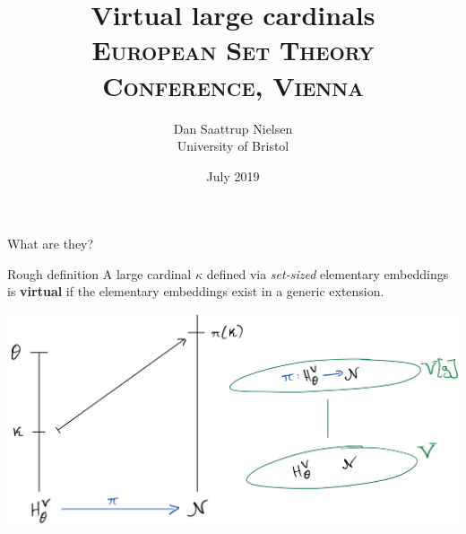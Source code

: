 \documentclass{beamer}
\title[Virtual large cardinals]{Virtual large cardinals\\ {\small\textsc{European Set Theory Conference, Vienna}}}
\author[Dan Saattrup Nielsen]{Dan Saattrup Nielsen\\ University of Bristol}
\date{July 2019}
\begin{document}
{

\begin{frame}
	\titlepage
\end{frame}
}

\begin{frame}{What are they?}
  \begin{block}{Rough definition}
    A large cardinal $\kappa$ defined via \textit{set-sized} elementary embeddings is \textbf{virtual} if the elementary embeddings exist in a generic extension.
  \end{block}

  \begin{center}
    \includegraphics[scale=0.15]{gfx/virtual.jpg}
  \end{center}
\end{frame}
\end{document}
